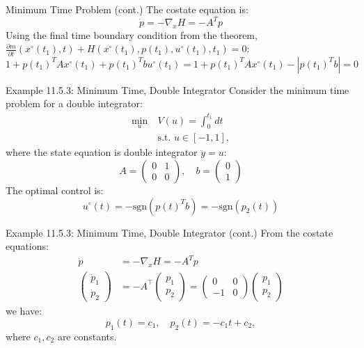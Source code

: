 \documentclass[10pt]{beamer}
\begin{document}
\begin{frame}[fragile]{Minimum Time Problem (cont.)}
  The costate equation is:
  \[
  \dot{p} = -\nabla_x H = -A^T p
  \]
  Using the final time boundary condition from the theorem, \( \frac{\partial m}{\partial t}(x^\circ(t_1), t) + H(x^\circ(t_1), p(t_1), u^\circ(t_1), t_1) = 0\):
  \[
  1 + p(t_1)^T A x^\circ(t_1) + p(t_1)^T b u^\circ(t_1) = 1 + p(t_1)^T A x^\circ(t_1) - |p(t_1)^T b| = 0
  \]
\end{frame}
  
\begin{frame}[fragile]{Example 11.5.3: Minimum Time, Double Integrator}
  Consider the minimum time problem for a double integrator:
  \[
    \begin{aligned}
      \min_{u} \ &V(u) = \int_0^{t_1} dt \\
      &\text{s.t. } u \in [-1, 1],
    \end{aligned}
  \]
  where the state equation is double integrator \( \ddot{y} = u \):
  \[
  A = \begin{pmatrix} 0 & 1 \\ 0 & 0 \end{pmatrix}, \quad b = \begin{pmatrix} 0 \\ 1 \end{pmatrix}
  \]
  The optimal control is:
  \[
  u^\circ(t) = -\text{sgn}(p(t)^T b) = -\text{sgn}(p_2(t))
  \]
\end{frame}
  
\begin{frame}[fragile]{Example 11.5.3: Minimum Time, Double Integrator (cont.)}
  From the costate equations:
  \[
  \begin{aligned}
    \dot{p} &= -\nabla_x H = -A^T p \\
    \begin{pmatrix}
      \dot{p}_{1}\\
      \dot{p}_{2}
      \end{pmatrix} &=-A^{\top }\begin{pmatrix}
      p_{1}\\
      p_{2}
      \end{pmatrix} =\begin{pmatrix}
        0 & 0\\
        -1 & 0
        \end{pmatrix}\begin{pmatrix}
        p_{1}\\
        p_{2}
        \end{pmatrix}
  \end{aligned}
  \]
  we have:
  \[
  p_1(t) = c_1, \quad p_2(t) = -c_1 t + c_2,
  \]
  where \( c_1, c_2 \) are constants.
\end{frame}
  
\end{document}
